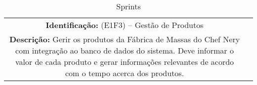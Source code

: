     \begin{table}[H]
    \centering
    \caption{Sprints}
    \begin{tabular}{c|p{10cm}}
    \hline
    \textbf{Identificação:} (E1F3) – Gestão de Produtos \\
    \textbf{Descrição:} Gerir os produtos da Fábrica de Massas do Chef Nery com integração ao banco de dados do sistema. Deve informar o valor de cada produto e gerar informações relevantes de acordo com o tempo acerca dos produtos.    \\
    \end{tabular}
    \end{table}
